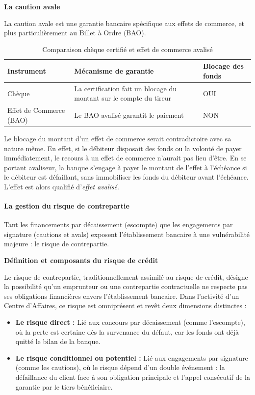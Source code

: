 \medskip\textbf{La caution avale}

La caution avale est une garantie bancaire spécifique aux effets de commerce, et plus particulièrement au Billet à Ordre (BAO).

\begin{table}[h!]
\centering
\begin{tabularx}{\textwidth}{X X X}
\toprule
Instrument & Mécanisme de garantie & Blocage des fonds \\
\midrule
Chèque & La certification fait un blocage du montant sur le compte du tireur & OUI \\
\addlinespace
Effet de Commerce (BAO) & Le BAO avalisé garantit le paiement & NON \\
\bottomrule
\end{tabularx}
\caption{Comparaison chèque certifié et effet de commerce avalisé}
\end{table}

Le blocage du montant d'un effet de commerce serait contradictoire avec sa nature même. En effet, si le débiteur disposait des fonds ou la volonté de payer immédiatement, le recours à un effet de commerce n'aurait pas lieu d'être. En se portant avaliseur, la banque s'engage à payer le montant de l'effet à l'échéance si le débiteur est défaillant, sans immobiliser les fonds du débiteur avant l'échéance. L'effet est alors qualifié d'\textit{effet avalisé}.

\paragraph{La gestion du risque de contrepartie}

Tant les financements par décaissement (escompte) que les engagements par signature (cautions et avals) exposent l'établissement bancaire à une vulnérabilité majeure : le risque de contrepartie.

\medskip\textbf{Définition et composants du risque de crédit}

Le risque de contrepartie, traditionnellement assimilé au risque de crédit, désigne la possibilité qu'un emprunteur ou une contrepartie contractuelle ne respecte pas ses obligations financières envers l'établissement bancaire. Dans l'activité d'un Centre d'Affaires, ce risque est omniprésent et revêt deux dimensions distinctes :

\begin{itemize}
  \item \textbf{Le risque direct :} Lié aux concours par décaissement (comme l'escompte), où la perte est certaine dès la survenance du défaut, car les fonds ont déjà quitté le bilan de la banque.
  \item \textbf{Le risque conditionnel ou potentiel :} Lié aux engagements par signature (comme les cautions), où le risque dépend d'un double événement : la défaillance du client face à son obligation principale et l'appel consécutif de la garantie par le tiers bénéficiaire.
\end{itemize}

